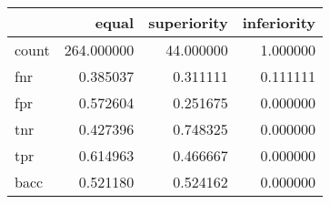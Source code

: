 \begin{tabular}{lrrr}
\toprule
{} &       equal &  superiority &  inferiority \\
\midrule
count &  264.000000 &    44.000000 &     1.000000 \\
fnr   &    0.385037 &     0.311111 &     0.111111 \\
fpr   &    0.572604 &     0.251675 &     0.000000 \\
tnr   &    0.427396 &     0.748325 &     0.000000 \\
tpr   &    0.614963 &     0.466667 &     0.000000 \\
bacc  &    0.521180 &     0.524162 &     0.000000 \\
\bottomrule
\end{tabular}
